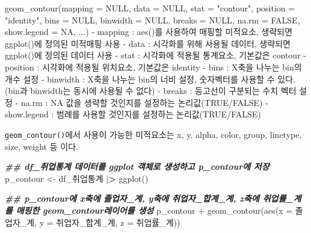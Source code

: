 \documentclass[
]{article}
\newenvironment{Shaded}{\begin{snugshade}}{\end{snugshade}}
\newcommand{\AttributeTok}[1]{\textcolor[rgb]{0.77,0.63,0.00}{#1}}
\newcommand{\ConstantTok}[1]{\textcolor[rgb]{0.00,0.00,0.00}{#1}}
\newcommand{\DocumentationTok}[1]{\textcolor[rgb]{0.56,0.35,0.01}{\textbf{\textit{#1}}}}
\newcommand{\ErrorTok}[1]{\textcolor[rgb]{0.64,0.00,0.00}{\textbf{#1}}}
\newcommand{\FunctionTok}[1]{\textcolor[rgb]{0.00,0.00,0.00}{#1}}
\newcommand{\NormalTok}[1]{#1}
\newcommand{\OtherTok}[1]{\textcolor[rgb]{0.56,0.35,0.01}{#1}}
\newcommand{\SpecialCharTok}[1]{\textcolor[rgb]{0.00,0.00,0.00}{#1}}
\newcommand{\StringTok}[1]{\textcolor[rgb]{0.31,0.60,0.02}{#1}}
\begin{document}
\begin{Shaded}
\begin{Highlighting}[]
\FunctionTok{geom\_contour}\NormalTok{(}\AttributeTok{mapping =} \ConstantTok{NULL}\NormalTok{, }\AttributeTok{data =} \ConstantTok{NULL}\NormalTok{, }\AttributeTok{stat =} \StringTok{"contour"}\NormalTok{, }\AttributeTok{position =} \StringTok{"identity"}\NormalTok{, }\AttributeTok{bins =} \ConstantTok{NULL}\NormalTok{, }\AttributeTok{binwidth =} \ConstantTok{NULL}\NormalTok{, }\AttributeTok{breaks =} \ConstantTok{NULL}\NormalTok{, }\AttributeTok{na.rm =} \ConstantTok{FALSE}\NormalTok{, }\AttributeTok{show.legend =} \ConstantTok{NA}\NormalTok{, ...)}
  \SpecialCharTok{{-}}\NormalTok{ mapping }\SpecialCharTok{:} \FunctionTok{aes}\NormalTok{()를 사용하여 매핑할 미적요소, 생략되면 }\FunctionTok{ggplot}\NormalTok{()에 정의된 미적매핑 사용}
  \SpecialCharTok{{-}}\NormalTok{ data }\SpecialCharTok{:}\NormalTok{ 시각화를 위해 사용될 데이터, 생략되면 }\FunctionTok{ggplot}\NormalTok{()에 정의된 데이터 사용}
  \SpecialCharTok{{-}}\NormalTok{ stat }\SpecialCharTok{:}\NormalTok{ 시각화에 적용될 통계요소, 기본값은 }\StringTok{\textquotesingle{}contour\textquotesingle{}}
  \SpecialCharTok{{-}}\NormalTok{ position }\SpecialCharTok{:}\NormalTok{ 시각화에 적용될 위치요소, 기본값은 }\StringTok{\textquotesingle{}identity\textquotesingle{}}
  \SpecialCharTok{{-}}\NormalTok{ bins }\SpecialCharTok{:}\NormalTok{ X축을 나누는 bin의 개수 설정}
  \SpecialCharTok{{-}}\NormalTok{ binwidth }\SpecialCharTok{:}\NormalTok{ X축을 나누는 bin의 너비 설정, 숫자벡터를 사용할 수 있다. (bin과 binwidth는 동시에 사용될 수 없다)}
  \SpecialCharTok{{-}}\NormalTok{ breaks }\SpecialCharTok{:}\NormalTok{ 등고선이 구분되는 수치 벡터 설정}
  \SpecialCharTok{{-}}\NormalTok{ na.rm }\SpecialCharTok{:} \ConstantTok{NA}\NormalTok{ 값을 생략할 것인지를 설정하는 논리값(}\ConstantTok{TRUE}\SpecialCharTok{/}\ConstantTok{FALSE}\NormalTok{)}
  \SpecialCharTok{{-}}\NormalTok{ show.legend }\SpecialCharTok{:}\NormalTok{ 범례를 사용할 것인지를 설정하는 논리값(}\ConstantTok{TRUE}\SpecialCharTok{/}\ConstantTok{FALSE}\NormalTok{) }
\end{Highlighting}
\end{Shaded}

\texttt{geom\_contour()}에서 사용이 가능한 미적요소는 x, y, alpha, color, group, linetype, size, weight 등 이다.

\begin{Shaded}
\begin{Highlighting}[]
\DocumentationTok{\#\#  df\_취업통계 데이터를 ggplot 객체로 생성하고 p\_contour에 저장}
\NormalTok{p\_contour }\OtherTok{\textless{}{-}}\NormalTok{ df\_취업통계 }\SpecialCharTok{|}\ErrorTok{\textgreater{}}
  \FunctionTok{ggplot}\NormalTok{()}

\DocumentationTok{\#\# p\_contour에 x축에 졸업자\_계, y축에 취업자\_합계\_계, z축에 취업률\_계를 매핑한 geom\_contour레이어를 생성}
\NormalTok{p\_contour }\SpecialCharTok{+} 
  \FunctionTok{geom\_contour}\NormalTok{(}\FunctionTok{aes}\NormalTok{(}\AttributeTok{x =}\NormalTok{ 졸업자\_계, }\AttributeTok{y =}\NormalTok{ 취업자\_합계\_계, }\AttributeTok{z =}\NormalTok{ 취업률\_계))}
\end{Highlighting}
\end{Shaded}
\end{document}
